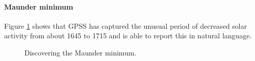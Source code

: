 \documentclass{article}
\begin{document}




\paragraph{Maunder minimum}

Figure \ref{fig:maunder} shows that GPSS has captured the unusual period of decreased solar activity from about 1645 to 1715 and is able to report this in natural language.

\begin{figure}[ht]
\centering
{}
\caption{Discovering the Maunder minimum.}
\label{fig:maunder}
\end{figure}
\end{document}
